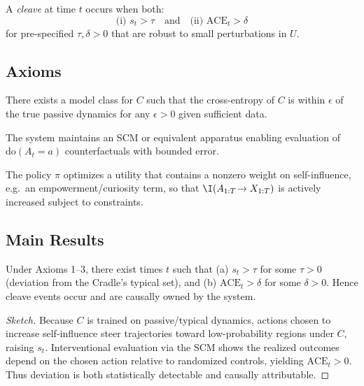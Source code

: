 \begin{definition}
A \emph{cleave} at time \(t\) occurs when both:
\[
\text{(i) } s_t>\tau \quad\text{and}\quad \text{(ii) } \mathrm{ACE}_t>\delta
\]
for pre-specified \(\tau,\delta>0\) that are robust to small perturbations in \(U\).
\end{definition}

\subsection{Axioms}
\begin{axiom}
There exists a model class for \(C\) such that the cross-entropy of \(C\) is within \(\epsilon\) of the true passive dynamics for any \(\epsilon>0\) given sufficient data.
\end{axiom}

\begin{axiom}
The system maintains an SCM or equivalent apparatus enabling evaluation of \(\mathrm{do}(A_t=a)\) counterfactuals with bounded error.
\end{axiom}

\begin{axiom}
The policy \(\pi\) optimizes a utility that contains a nonzero weight on self-influence, e.g.\ an empowerment/curiosity term, so that \(\I(A_{1:T}\!\to X_{1:T})\) is actively increased subject to constraints.
\end{axiom}

\subsection{Main Results}

\begin{theorem}\label{thm:knowable}
Under Axioms 1--3, there exist times \(t\) such that (a) \(s_t>\tau\) for some \(\tau>0\) (deviation from the Cradle's typical set), and (b) \(\mathrm{ACE}_t>\delta\) for some \(\delta>0\). Hence cleave events occur and are causally owned by the system.
\end{theorem}

\begin{proof}[Sketch]
Because \(C\) is trained on passive/typical dynamics, actions chosen to increase self-influence steer trajectories toward low-probability regions under \(C\), raising \(s_t\). Interventional evaluation via the SCM shows the realized outcomes depend on the chosen action relative to randomized controls, yielding \(\mathrm{ACE}_t>0\). Thus deviation is both statistically detectable and causally attributable.
\end{proof}

